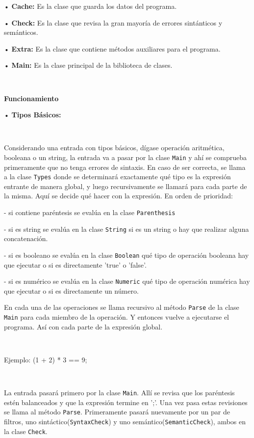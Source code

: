 \documentclass{article}
\begin{document}
• \textbf{Cache:} Es la clase que guarda los datos del programa. 

• \textbf{Check:} Es la clase que revisa la gran mayoría de errores sintánticos y 
semánticos. 

• \textbf{Extra:} Es la clase que contiene métodos auxiliares para el programa.

• \textbf{Main:} Es la clase principal de la biblioteca de clases.


\


\begin{center}
	\large\textbf{Funcionamiento}
\end{center}


• \textbf{Tipos Básicos:}


\


Considerando una entrada con tipos básicos, dígase operación aritmética, booleana o un string, la entrada va a
pasar por la clase {\texttt{Main}} y ahí se comprueba primeramente que no tenga errores de sintaxis. En caso de ser
correcta, se llama a la clase {\texttt{Types}} donde se determinará exactamente qué tipo es la expresión entrante 
de manera global, y luego recursivamente se llamará para cada parte de la misma. Aquí se decide qué hacer con la 
expresión. En orden de prioridad:


- si contiene paréntesis se evalúa en la clase {\texttt{Parenthesis}}


- si es string se evalúa en la clase {\texttt{String}} si es un string o hay que realizar alguna concatenación.


- si es booleano se evalúa en la clase {\texttt{Boolean}} qué tipo de operación booleana hay que ejecutar o si es
directamente 'true' o 'false'.


- si es numérico se evalúa en la clase {\texttt{Numeric}} qué tipo de operación numérica hay que ejecutar o si es 
directamente un número.


En cada una de las operaciones se llama recursivo al método {\texttt{Parse}} de la clase {\texttt{Main}} para 
cada miembro de la operación. Y entonces vuelve a ejecutarse el programa. Así con cada parte de la expresión global.


\ 


Ejemplo: (1 + 2) * 3 == 9;


\


La entrada pasará primero por la clase {\texttt{Main}}. Allí se revisa que los paréntesis estén balanceados y que
la expresión termine en ';'. Una vez pasa estas revisiones se llama al método {\texttt{Parse}}. Primeramente pasará
nuevamente por un par de filtros, uno sintáctico({\texttt{SyntaxCheck}}) y uno semántico({\texttt{SemanticCheck}}),
ambos en la clase {\texttt{Check}}.
\end{document}
